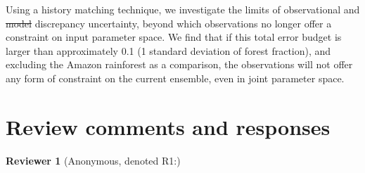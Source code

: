 \documentclass[esd, manuscript]{copernicus}
\providecommand{\DIFadd}[1]{{\protect\color{blue}\uwave{#1}}} %
\providecommand{\DIFdel}[1]{{\protect\color{red}\sout{#1}}}                      %
\providecommand{\DIFaddbegin}{} %
\providecommand{\DIFaddend}{} %
\providecommand{\DIFdelbegin}{} %
\providecommand{\DIFdelend}{} %
\begin{document}
Using a history matching technique, we investigate the limits of observational and \DIFdelbegin \DIFdel{model }\DIFdelend \DIFaddbegin \DIFadd{simulator }\DIFaddend discrepancy uncertainty, beyond which observations no longer offer a constraint on input parameter space. We find that if this total error budget is larger than approximately 0.1 (1 standard deviation of forest fraction), and excluding the Amazon rainforest as a comparison, the observations will not offer any form of constraint on the current ensemble, even in joint parameter space.


\section*{Review comments and responses}

\textbf{Reviewer 1} (Anonymous, denoted R1:)
\end{document}
